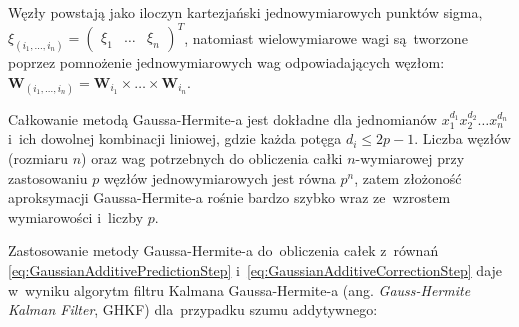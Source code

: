 Węzły powstają jako iloczyn kartezjański jednowymiarowych punktów sigma, $\xi_{(i_1, \dots, i_n)}=\begin{pmatrix}
\xi_1 & \dots & \xi_n
\end{pmatrix}^T$, natomiast wielowymiarowe wagi są~tworzone poprzez pomnożenie jednowymiarowych wag odpowiadających węzłom: $\boldsymbol{W}_{(i_1, \dots, i_n)} = \boldsymbol{W}_{i_1} \times \dots \times \boldsymbol{W}_{i_n}$. \\
\par
Całkowanie metodą Gaussa-Hermite-a jest dokładne dla jednomianów $x_{1}^{d_{1}} x_{2}^{d_{2}} \dots x_{n}^{d_{n}}$ i~ich dowolnej kombinacji liniowej, gdzie każda potęga $d_i \leq 2p-1$. Liczba węzłów (rozmiaru $n$) oraz wag potrzebnych do obliczenia całki $n$-wymiarowej przy zastosowaniu $p$ węzłów jednowymiarowych jest równa $p^n$, zatem złożoność aproksymacji Gaussa-Hermite-a rośnie bardzo szybko wraz ze~wzrostem wymiarowości i~liczby $p$.
\par
Zastosowanie metody Gaussa-Hermite-a do~obliczenia całek z~równań \ref{eq:GaussianAdditivePredictionStep} i~\ref{eq:GaussianAdditiveCorrectionStep} daje w~wyniku algorytm filtru Kalmana Gaussa-Hermite-a (ang. \textit{Gauss-Hermite Kalman Filter}, GHKF) dla~przypadku szumu addytywnego:
